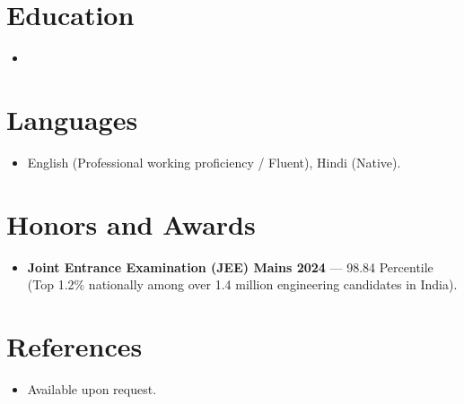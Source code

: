 \documentclass[11pt,a4paper,sans]{moderncv}
\begin{document}
\section{Education}
\vspace{1pt}
\begin{itemize}

\item{}

\end{itemize}


\section{Languages}
\vspace{1pt}
\begin{itemize}
\item {English (Professional working proficiency / Fluent), Hindi (Native).}
\end{itemize}


\section{Honors and Awards}
\vspace{1pt}
\begin{itemize}
\item{\textbf{Joint Entrance Examination (JEE) Mains 2024} --- 98.84 Percentile (Top 1.2\% nationally among over 1.4 million engineering candidates in India).}
\end{itemize}


\section{References}
\vspace{1pt}
\begin{itemize}
\item{Available upon request.}
\end{itemize}
\end{document}
